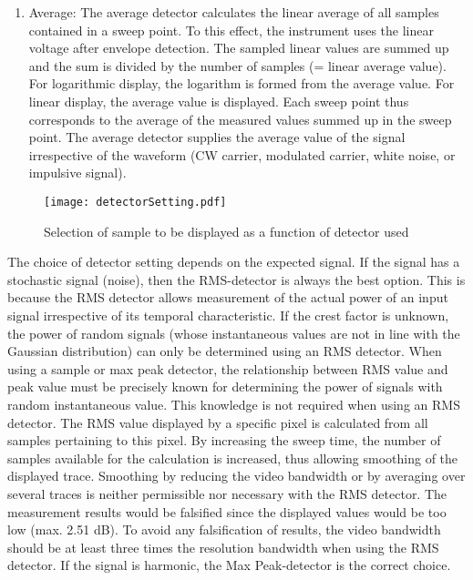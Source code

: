 \begin{enumerate}
  \item Average: The average detector calculates the linear average of all samples contained in a sweep point. To this effect, the instrument uses the linear voltage after envelope detection. The sampled linear values are summed up and the sum is divided by the number of samples (= linear average value). For logarithmic display, the logarithm is formed from the average value. For linear display, the average value is displayed. Each sweep point thus corresponds to the average of the measured values summed up in the sweep point. The average detector supplies the average value of the signal irrespective of the waveform (\acs{CW} carrier, modulated carrier, white noise, or impulsive signal). 
  \end{enumerate}
  
\begin{figure}[H]
\centering
\texttt{[image: detectorSetting.pdf]}
\caption{Selection of sample to be displayed as a function of detector used \cite{funsspec}}
\label{fig:detectorSettings}
\end{figure}

The choice of detector setting depends on the expected signal. If the signal has a stochastic signal (noise), then the \acs{RMS}-detector is always the best option. This is because the \acs{RMS} detector allows measurement of the actual power of an input signal irrespective of its temporal characteristic. If the crest factor is unknown, the power of random signals (whose instantaneous values are not in line with the Gaussian distribution) can only be determined using an \acs{RMS} detector. When using a sample or max peak detector, the relationship between \acs{RMS} value and peak value must be precisely known for determining the power of signals with random instantaneous value. This knowledge is not required when using an \acs{RMS} detector. The \acs{RMS} value displayed by a specific pixel is calculated from all samples pertaining to this pixel. By increasing the sweep time, the number of samples available for the calculation is increased, thus allowing smoothing of the displayed trace. Smoothing by reducing the video bandwidth or by averaging over several traces is neither permissible nor necessary with the \acs{RMS} detector. The measurement results would be falsified since the displayed values would be too low (max. 2.51 dB). To avoid any falsification of results, the video bandwidth should be at least three times the resolution bandwidth when using the \acs{RMS} detector. If the signal is harmonic, the Max Peak-detector is the correct choice. 


